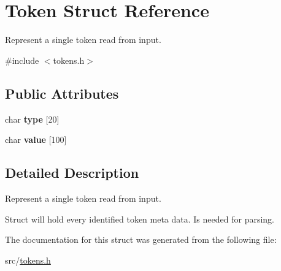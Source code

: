 \hypertarget{struct_token}{}\section{Token Struct Reference}
\label{struct_token}


Represent a single token read from input.  




{\ttfamily \#include $<$tokens.\+h$>$}

\subsection*{Public Attributes}
\begin{DoxyCompactItemize}
\item 
\mbox{\label{struct_token_ab8c9876b0a3f630d1022e8eb99f5de81}} 
char {\bfseries type} \mbox{[}20\mbox{]}
\item 
\mbox{\label{struct_token_ae3a20bd709dc24779b6dfcc5e6eb932d}} 
char {\bfseries value} \mbox{[}100\mbox{]}
\end{DoxyCompactItemize}


\subsection{Detailed Description}
Represent a single token read from input. 

Struct will hold every identified token meta data. Is needed for parsing. 

The documentation for this struct was generated from the following file\+:\begin{DoxyCompactItemize}
\item 
src/\mbox{\hyperlink{tokens_8h}{tokens.\+h}}\end{DoxyCompactItemize}

